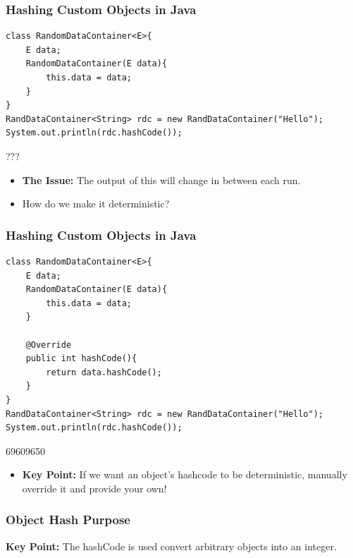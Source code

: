 \documentclass{beamer}
\begin{document}
\begin{frame}[fragile]
    \frametitle{Hashing Custom Objects in Java}
    \begin{lstlisting}[frame=trBL]
class RandomDataContainer<E>{
    E data;
    RandomDataContainer(E data){
        this.data = data;
    }
}
RandDataContainer<String> rdc = new RandDataContainer("Hello");
System.out.println(rdc.hashCode());
    \end{lstlisting}
    \vspace{-0.2cm}
    \begin{shell}
???
    \end{shell}
    \begin{itemize}
        \item \textbf{The Issue:} The output of this will change in between each run.
        \item How do we make it deterministic?
    \end{itemize}
\end{frame}

\begin{frame}[fragile]
    \frametitle{Hashing Custom Objects in Java}
    \begin{lstlisting}[frame=trBL, basicstyle=\scriptsize]
class RandomDataContainer<E>{
    E data;
    RandomDataContainer(E data){
        this.data = data;
    }

    @Override
    public int hashCode(){
        return data.hashCode();
    }
}
RandDataContainer<String> rdc = new RandDataContainer("Hello");
System.out.println(rdc.hashCode());
    \end{lstlisting}
    \begin{minipage}{0.49\textwidth}
    \begin{shell}
69609650
    \end{shell}
    \end{minipage}
    \begin{minipage}{0.49\textwidth}
    \begin{itemize}
        \item \textbf{Key Point:} If we want an object's hashcode to be deterministic, manually override it and provide your own!
    \end{itemize}
    \end{minipage}
\end{frame}

\begin{frame}[fragile]
    \frametitle{Object Hash Purpose}
    \centering
    \textbf{Key Point:} The hashCode is used convert arbitrary objects into an integer.
\end{frame}
\end{document}
